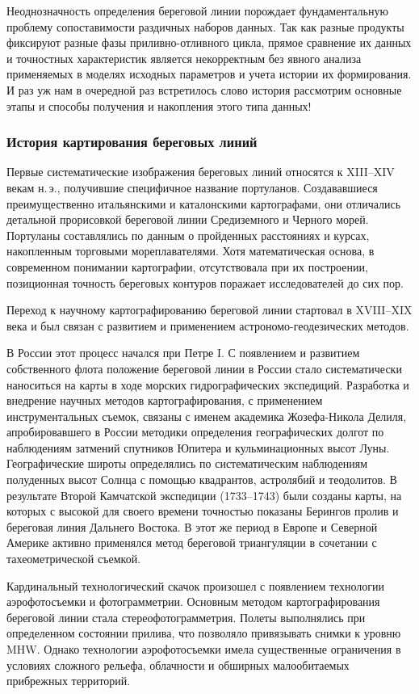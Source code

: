 Неоднозначность определения береговой линии порождает фундаментальную проблему сопоставимости раздичных наборов данных.
Так как разные продукты фиксируют разные фазы приливно-отливного цикла, прямое сравнение их данных и точностных характеристик является некорректным без явного анализа применяемых в моделях исходных параметров и учета истории их формирования.
И раз уж нам в очередной раз встретилось слово история рассмотрим основные этапы и способы получения и накопления этого типа данных! 

\subsubsection{История картирования береговых линий}

Первые систематические изображения береговых линий относятся к XIII–XIV векам н.\,э., получившие специфичное название портуланов.
Создававшиеся преимущественно итальянскими и каталонскими картографами, они отличались детальной прорисовкой береговой линии Средиземного и Черного морей.
Портуланы составлялись по данным о пройденных расстояниях и курсах, накопленным торговыми мореплавателями.
Хотя математическая основа, в современном понимании картографии, отсутствовала при их построении, позиционная точность береговых контуров поражает исследователей до сих пор. 

Переход к научному картографированию береговой линии стартовал в XVIII–XIX века и был связан с развитием и применением астрономо-геодезических методов. 

В России этот процесс начался при Петре I.
С появлением и развитием собственного флота положение береговой линии в России стало систематически наноситься на карты в ходе морских гидрографических экспедиций.
Разработка и внедрение научных методов картографирования, с применением инструментальных съемок, связаны с именем академика Жозефа-Никола Делиля, апробировавшего в России методики определения географических долгот по наблюдениям затмений спутников Юпитера и кульминационных высот Луны. 
Географические широты определялись по систематическим наблюдениям полуденных высот Солнца с помощью квадрантов, астролябий и теодолитов.
В результате Второй Камчатской экспедиции (1733–1743) были созданы карты, на которых с высокой для своего времени точностью показаны Берингов пролив и береговая линия Дальнего Востока. 
В этот же период в Европе и Северной Америке активно применялся метод береговой триангуляции в сочетании с тахеометрической съемкой. 

Кардинальный технологический скачок произошел с появлением технологии аэрофотосъемки и фотограмметрии. 
Основным методом картографирования береговой линии стала стереофотограмметрия.
Полеты выполнялись при определенном состоянии прилива, что позволяло привязывать снимки к уровню MHW. 
Однако технологии аэрофотосъемки имела существенные ограничения в условиях сложного рельефа, облачности и обширных малообитаемых прибрежных территорий.

